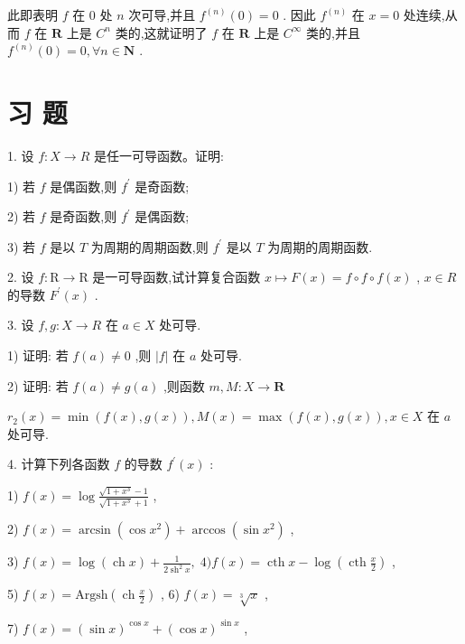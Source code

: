 此即表明 $f$ 在 0 处 $n$ 次可导,并且 ${f}^{\left( n\right) }\left( 0\right)  = 0$ . 因此 ${f}^{\left( n\right) }$ 在 $x = 0$ 处连续,从而 $f$ 在 $\mathbf{R}$ 上是 ${C}^{n}$ 类的,这就证明了 $f$ 在 $\mathbf{R}$ 上是 ${C}^{\infty }$ 类的,并且 ${f}^{\left( n\right) }\left( 0\right)  = 0,\forall n \in  \mathbf{N}$ .

\section*{习 题}

1. 设 $f : X \rightarrow  R$ 是任一可导函数。证明:

1) 若 $f$ 是偶函数,则 ${f}^{\prime }$ 是奇函数;

2) 若 $f$ 是奇函数,则 ${f}^{\prime }$ 是偶函数;

3) 若 $f$ 是以 $T$ 为周期的周期函数,则 ${f}^{\prime }$ 是以 $T$ 为周期的周期函数.

2. 设 $f : \mathrm{R} \rightarrow  \mathrm{R}$ 是一可导函数,试计算复合函数 $x \mapsto  F\left( x\right)  = f \circ  f \circ  f\left( x\right)$ , $x \in  R$ 的导数 ${F}^{\prime }\left( x\right)$ .

3. 设 $f,g : X \rightarrow  R$ 在 $a \in  X$ 处可导.

1) 证明: 若 $f\left( a\right)  \neq  0$ ,则 $\left| f\right|$ 在 $a$ 处可导.

2) 证明: 若 $f\left( a\right)  \neq  g\left( a\right)$ ,则函数 $m,M : X \rightarrow  \mathbf{R}$

${r}_{2}\left( x\right)  = \min \left( {f\left( x\right) ,g\left( x\right) }\right) ,M\left( x\right)  = \max \left( {f\left( x\right) ,g\left( x\right) }\right) ,x \in  X$ 在 $a$ 处可导.

4. 计算下列各函数 $f$ 的导数 ${f}^{\prime }\left( x\right)$ :

1) $f\left( x\right)  = \log \frac{\sqrt{1 + {x}^{3}} - 1}{\sqrt{1 + {x}^{3}} + 1}$ ,

2) $f\left( x\right)  = \arcsin \left( {\cos {x}^{2}}\right)  + \arccos \left( {\sin {x}^{2}}\right)$ ,

3) $f\left( x\right)  = \log \left( {\operatorname{ch}x}\right)  + \frac{1}{2{\operatorname{sh}}^{2}x},\;4)f\left( x\right)  = \operatorname{cth}x - \log \left( {\operatorname{cth}\frac{x}{2}}\right)$ ,

5) $f\left( x\right)  = \mathrm{{Argsh}}\left( {\operatorname{ch}\frac{x}{2}}\right)$ , 6) $f\left( x\right)  = \sqrt[3]{x}$ ,

7) $f\left( x\right)  = {\left( \sin x\right) }^{\cos x} + {\left( \cos x\right) }^{\sin x}$ ,

